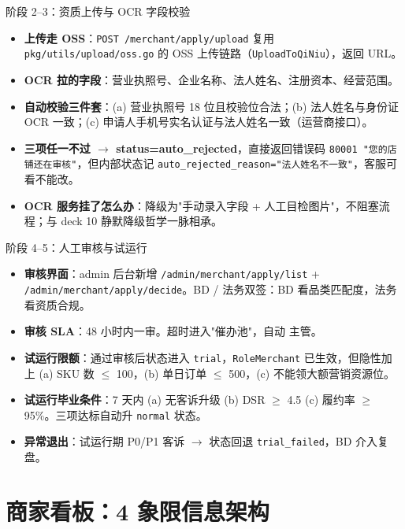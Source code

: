 \documentclass[aspectratio=169,11pt]{beamer}
\begin{document}
\begin{frame}[shrink]{阶段 2--3：资质上传与 OCR 字段校验}
\begin{itemize}
  \item \textbf{上传走 OSS}：\texttt{POST /merchant/apply/upload} 复用 \texttt{pkg/utils/upload/oss.go} 的 OSS 上传链路（\texttt{UploadToQiNiu}），返回 URL。
  \item \textbf{OCR 拉的字段}：营业执照号、企业名称、法人姓名、注册资本、经营范围。
  \item \textbf{自动校验三件套}：(a) 营业执照号 18 位且校验位合法；(b) 法人姓名与身份证 OCR 一致；(c) 申请人手机号实名认证与法人姓名一致（运营商接口）。
  \item \textbf{三项任一不过 $\to$ status=auto\_rejected}，直接返回错误码 \texttt{80001 "您的店铺还在审核"}，但内部状态记 \texttt{auto\_rejected\_reason="法人姓名不一致"}，客服可看不能改。
  \item \textbf{OCR 服务挂了怎么办}：降级为"手动录入字段 + 人工目检图片"，不阻塞流程；与 deck 10 静默降级哲学一脉相承。
\end{itemize}
\end{frame}

\begin{frame}[shrink]{阶段 4--5：人工审核与试运行}
\begin{itemize}
  \item \textbf{审核界面}：admin 后台新增 \texttt{/admin/merchant/apply/list} + \texttt{/admin/merchant/apply/decide}。BD / 法务双签：BD 看品类匹配度，法务看资质合规。
  \item \textbf{审核 SLA}：48 小时内一审。超时进入"催办池"，自动 \@ 主管。
  \item \textbf{试运行限额}：通过审核后状态进入 \texttt{trial}，\texttt{RoleMerchant} 已生效，但隐性加上 (a) SKU 数 $\le$ 100，(b) 单日订单 $\le$ 500，(c) 不能领大额营销资源位。
  \item \textbf{试运行毕业条件}：7 天内 (a) 无客诉升级 (b) DSR $\ge$ 4.5 (c) 履约率 $\ge$ 95\%。三项达标自动升 \texttt{normal} 状态。
  \item \textbf{异常退出}：试运行期 P0/P1 客诉 $\to$ 状态回退 \texttt{trial\_failed}，BD 介入复盘。
\end{itemize}
\end{frame}

\section{商家看板：4 象限信息架构}
\end{document}
